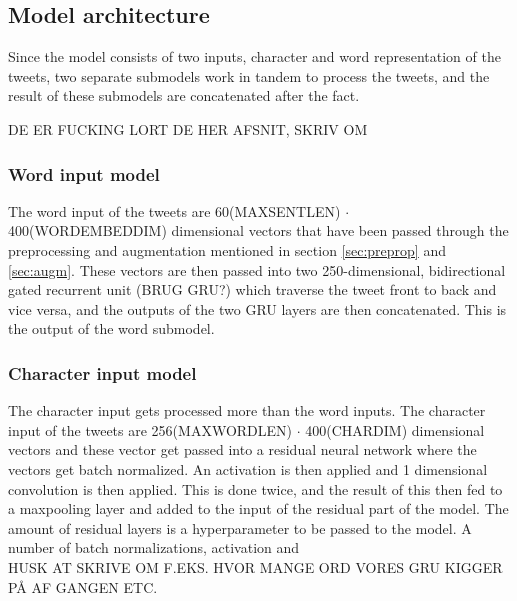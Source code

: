 \subsection{Model architecture}
Since the model consists of two inputs, character and word representation of the tweets, two separate submodels work in tandem to process the tweets, and the result of these submodels are concatenated after the fact.

DE ER FUCKING LORT DE HER AFSNIT, SKRIV OM

\subsubsection{Word input model}
The word input of the tweets are 60(MAXSENTLEN) $\cdot$ 400(WORDEMBEDDIM) dimensional vectors that have been passed through the preprocessing and augmentation mentioned in section \ref{sec:preprop} and \ref{sec:augm}. These vectors are then passed into two 250-dimensional, bidirectional gated recurrent unit (BRUG GRU?) which traverse the tweet front to back and vice versa, and the outputs of the two GRU layers are then concatenated. This is the output of the word submodel.

\subsubsection{Character input model}
The character input gets processed more than the word inputs. The character input of the tweets are 256(MAXWORDLEN) $\cdot$ 400(CHARDIM) dimensional vectors and these vector get passed into a residual neural network where the vectors get batch normalized. An activation is then applied and 1 dimensional convolution is then applied. This is done twice, and the result of this then fed to a maxpooling layer and added to the input of the residual part of the model. The amount of residual layers is a hyperparameter to be passed to the model. A number of batch normalizations, activation and\\
HUSK AT SKRIVE OM F.EKS. HVOR MANGE ORD VORES GRU KIGGER PÅ AF GANGEN ETC.

